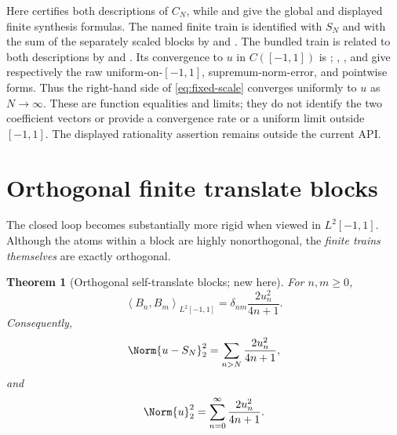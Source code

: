 \documentclass[11pt,oneside]{article}
\numberwithin{equation}{section}
\newtheorem{theorem}{Theorem}[section]
\theoremstyle{definition}
\theoremstyle{remark}
\newcommand{\inner}[2]{\left\langle#1,#2\right\rangle}
\begin{document}
Here  certifies
both descriptions of $C_N$, while
 and
 give the
global and displayed finite synthesis formulas.  The named finite train is
identified with $S_N$ and with the sum of the separately scaled blocks by
and .
The bundled train is related to both descriptions by
and .  Its
convergence to $u$ in $C([-1,1])$ is
;
,
, and
 give respectively the
raw uniform-on-$[-1,1]$, supremum-norm-error, and pointwise forms.  Thus the
right-hand side of \eqref{eq:fixed-scale} converges uniformly to $u$ as
$N\to\infty$.  These are function equalities and limits; they do not identify
the two coefficient vectors or provide a convergence rate or a uniform limit
outside $[-1,1]$.  The displayed rationality assertion remains outside the
current API.

\section{Orthogonal finite translate blocks}
\label{sec:orthogonal-blocks}

The closed loop becomes substantially more rigid when viewed in
$L^2[-1,1]$.  Although the atoms within a block are highly nonorthogonal, the
\emph{finite trains themselves} are exactly orthogonal.

\begin{theorem}[Orthogonal self-translate blocks; new here]
\label{thm:block-orthogonality}
For $n,m\ge0$,
\begin{equation}
 \boxed{
 \inner{B_n}{B_m}_{L^2[-1,1]}
 =\delta_{nm}\frac{2u_n^2}{4n+1}.}
 \label{eq:block-orthogonality}
\end{equation}
Consequently,
\begin{equation}
 \Norm{u-S_N}_2^2
 =\sum_{n>N}\frac{2u_n^2}{4n+1},
 \label{eq:exact-L2-tail}
\end{equation}
and
\begin{equation}
 \Norm{u}_2^2=\sum_{n=0}^{\infty}\frac{2u_n^2}{4n+1}.
 \label{eq:parseval-up}
\end{equation}
\end{theorem}
\end{document}
